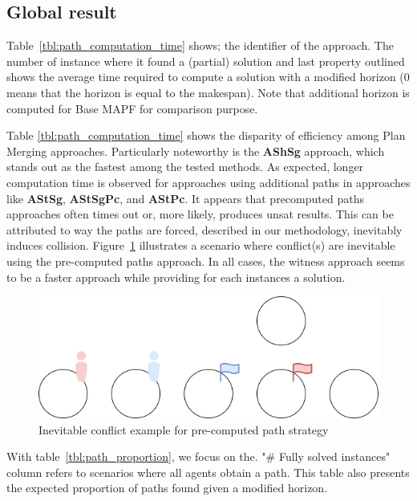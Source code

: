 \subsection{Global result}

 Table~\ref{tbl:path_computation_time} shows; the identifier of the approach. The number of instance where it found a (partial) solution and last property outlined shows the average time required to compute a solution with a modified horizon (0 means that the horizon is equal to the makespan). Note that additional horizon is computed for Base MAPF for comparison purpose.




 Table \ref{tbl:path_computation_time} shows the disparity of efficiency among Plan Merging approaches. Particularly noteworthy is the \textbf{AShSg} approach, which stands out as the fastest among the tested methods. As expected, longer computation time is observed for approaches using additional paths in approaches like \textbf{AStSg}, \textbf{AStSgPc}, and \textbf{AStPc}.
It appears that precomputed paths approaches often times out or, more likely, produces unsat results. This can be attributed to way the paths are forced, described in our methodology, inevitably induces collision. Figure~\ref{fig:precomputed_path_conflict} illustrates a scenario where conflict(s) are inevitable using the pre-computed paths approach.
In all cases, the witness approach seems to be a faster approach while providing for each instances a solution.
\begin{figure}[H]
    \centering
    \caption{Inevitable conflict example for pre-computed path strategy}\label{fig:precomputed_path_conflict}
    \includegraphics[width=\widthimg]{img/precomputed_path_conflict.drawio.png}
\end{figure}


With table~\ref{tbl:path_proportion}, we focus on the. "\# Fully solved instances" column refers to scenarios where all agents obtain a path. This table also presents the expected proportion of paths found given a modified horizon.

